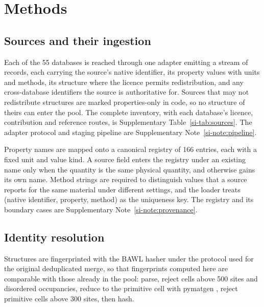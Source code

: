 \section{Methods}

\subsection{Sources and their ingestion}

Each of the 55 databases is reached through one adapter emitting a stream of
records, each carrying the source's native identifier, its property values with
units and methods, its structure where the licence permits redistribution, and
any cross-database identifiers the source is authoritative for. Sources that may
not redistribute structures are marked properties-only in code, so no structure
of theirs can enter the pool. The complete inventory, with each database's
licence, contribution and reference routes, is Supplementary
Table~\ref{si-tab:sources}. The adapter protocol and staging pipeline are
Supplementary Note~\ref{si-note:pipeline}.

Property names are mapped onto a canonical registry of 166 entries, each with a
fixed unit and value kind. A source field enters the registry under an existing
name only when the quantity is the same physical quantity, and otherwise gains
its own name. Method strings are required to distinguish values that a source
reports for the same material under different settings, and the loader treats
(native identifier, property, method) as the uniqueness key. The registry and its
boundary cases are Supplementary Note~\ref{si-note:provenance}.

\subsection{Identity resolution}

Structures are fingerprinted with the BAWL hasher \cite{ramlaoui2025lemat} under
the protocol used for the original deduplicated merge, so that fingerprints
computed here are comparable with those already in the pool: parse, reject cells
above 500 sites and disordered occupancies, reduce to the primitive cell with
pymatgen \cite{ong2013python}, reject primitive cells above 300 sites, then hash.

